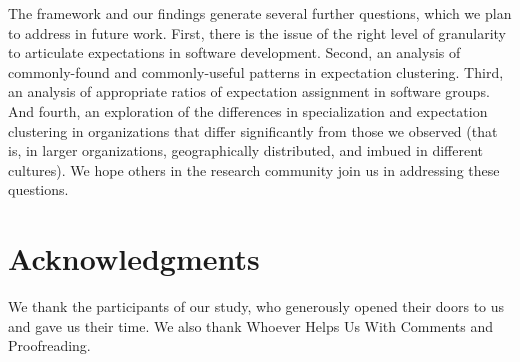 \documentclass[10pt, conference, compsocconf]{IEEEtran}
\begin{document}
The framework and our findings generate several further questions, which we plan to address in future work. First, there is the issue of the right level of granularity to articulate expectations in software development. Second, an analysis of commonly-found and commonly-useful patterns in expectation clustering. Third, an analysis of  appropriate ratios of expectation assignment in software groups. And fourth, an exploration of the differences in specialization and expectation clustering in organizations that differ significantly from those we observed (that is, in larger organizations, geographically distributed, and imbued in different cultures). We hope others in the research community join us in addressing these questions.




\section*{Acknowledgments}

We thank the participants of our study, who generously opened their doors to us and gave us their time. We also thank Whoever Helps Us With Comments and Proofreading.



\end{document}
